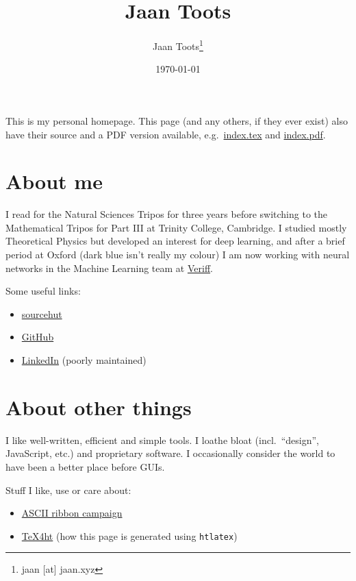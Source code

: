 \documentclass{article}
\title{Jaan Toots}
\author{Jaan Toots\footnote{jaan [at] jaan.xyz}}
\date{\today}
\begin{document}
\maketitle

This is my personal homepage. This page (and any others, if they ever exist)
also have their source and a PDF version available, e.g.\ \url{index.tex} and
\url{index.pdf}.

\section{About me}

I read for the Natural Sciences Tripos for three years before switching to the
Mathematical Tripos for Part III at Trinity College, Cambridge. I studied
mostly Theoretical Physics but developed an interest for deep learning, and
after a brief period at Oxford (dark blue isn't really my colour) I am now
working with neural networks in the Machine Learning team at
\href{https://veriff.me/}{Veriff}.

Some useful links:

\begin{itemize}
  \item \href{https://git.sr.ht/~jaan/}{sourcehut}
  \item \href{https://github.com/jaantoots}{GitHub}
  \item \href{https://www.linkedin.com/in/jaantoots/}{LinkedIn} (poorly
    maintained)
\end{itemize}

\section{About other things}

I like well-written, efficient and simple tools. I loathe bloat (incl.\
``design'', JavaScript, etc.) and proprietary software. I occasionally consider
the world to have been a better place before GUIs.

Stuff I like, use or care about:

\begin{itemize}
  \item \href{http://www.asciiribbon.org/}{ASCII ribbon campaign}
  \item \href{https://www.tug.org/tex4ht/}{TeX4ht} (how this page is generated
    using \texttt{htlatex})
\end{itemize}
\end{document}
